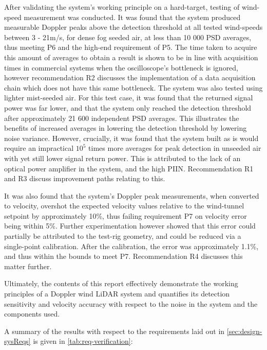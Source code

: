  After validating the system's working principle on a hard-target, testing of wind-speed measurement was conducted. It was found that the system produced measurable Doppler peaks above the detection threshold at all tested wind-speeds between 3 - 21m/s, for dense fog seeded air, at less than 10 000 PSD averages, thus meeting P6 and the high-end requirement of P5. The time taken to acquire this amount of averages to obtain a result is shown to be in line with acquisition times in commercial systems when the oscilloscope's bottleneck is ignored, however recommendation R2 discusses the implementation of a data acquisition chain which does not have this same bottleneck. The system was also tested using lighter mist-seeded air. For this test case, it was found that the returned signal power was far lower, and that the system only reached the detection threshold after approximately 21 600 independent PSD averages. This illustrates the benefits of increased averages in lowering the detection threshold by lowering noise variance. However, crucially, it was found that the system built as is would require an impractical $10^5$ times more averages for peak detection in unseeded air with yet still lower signal return power. This is attributed to the lack of an optical power amplifier in the system, and the high PIIN. Recommendation R1 and R3 discuss improvement paths relating to this. 
 
 It was also found that the system's Doppler peak measurements, when converted to velocity, overshot the expected velocity values relative to the wind-tunnel setpoint by approximately 10\%, thus failing requirement P7 on velocity error being within 5\%. Further experimentation however showed that this error could partially be attributed to the test-rig geometry, and could be reduced via a single-point calibration. After the calibration, the error was approximately 1.1\%, and thus within the bounds to meet P7. Recommendation R4 discusses this matter further.
 
 Ultimately, the contents of this report effectively demonstrate the working principles of a Doppler wind LiDAR system and quantifies its detection sensitivity and velocity accuracy with respect to the noise in the system and the components used.
 
 A summary of the results with respect to the requirements laid out in \autoref{sec:design-sysReqs} is given in \autoref{tab:req-verification}:
 
